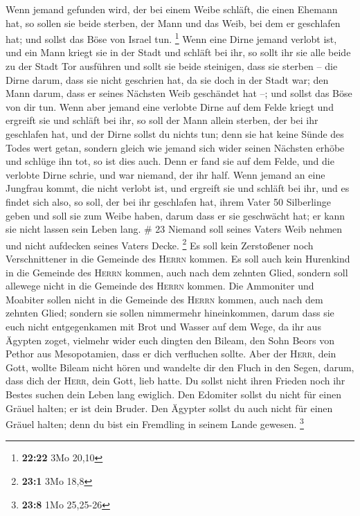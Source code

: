  Wenn jemand gefunden wird, der bei einem Weibe schläft,
die einen Ehemann hat, so sollen sie beide sterben, der Mann und das
Weib, bei dem er geschlafen hat; und sollst das Böse von Israel tun.
\footnote{\textbf{22:22} 3Mo 20,10}  Wenn eine Dirne
jemand verlobt ist, und ein Mann kriegt sie in der Stadt und schläft bei
ihr,  so sollt ihr sie alle beide zu der Stadt Tor
ausführen und sollt sie beide steinigen, dass sie sterben -- die Dirne
darum, dass sie nicht geschrien hat, da sie doch in der Stadt war; den
Mann darum, dass er seines Nächsten Weib geschändet hat --; und sollst
das Böse von dir tun.  Wenn aber jemand eine verlobte
Dirne auf dem Felde kriegt und ergreift sie und schläft bei ihr, so soll
der Mann allein sterben, der bei ihr geschlafen hat,  und
der Dirne sollst du nichts tun; denn sie hat keine Sünde des Todes wert
getan, sondern gleich wie jemand sich wider seinen Nächsten erhöbe und
schlüge ihn tot, so ist dies auch.  Denn er fand sie auf
dem Felde, und die verlobte Dirne schrie, und war niemand, der ihr half.
 Wenn jemand an eine Jungfrau kommt, die nicht verlobt
ist, und ergreift sie und schläft bei ihr, und es findet sich also,
 so soll, der bei ihr geschlafen hat, ihrem Vater 50
Silberlinge geben und soll sie zum Weibe haben, darum dass er sie
geschwächt hat; er kann sie nicht lassen sein Leben lang. \# 23
 Niemand soll seines Vaters Weib nehmen und nicht
aufdecken seines Vaters Decke. \footnote{\textbf{23:1} 3Mo 18,8}
 Es soll kein Zerstoßener noch Verschnittener in die
Gemeinde des \textsc{Herrn} kommen.  Es soll auch kein
Hurenkind in die Gemeinde des \textsc{Herrn} kommen, auch nach dem
zehnten Glied, sondern soll allewege nicht in die Gemeinde des
\textsc{Herrn} kommen.  Die Ammoniter und Moabiter sollen
nicht in die Gemeinde des \textsc{Herrn} kommen, auch nach dem zehnten
Glied; sondern sie sollen nimmermehr hineinkommen,  darum
dass sie euch nicht entgegenkamen mit Brot und Wasser auf dem Wege, da
ihr aus Ägypten zoget, vielmehr wider euch dingten den Bileam, den Sohn
Beors von Pethor aus Mesopotamien, dass er dich verfluchen sollte.
 Aber der \textsc{Herr}, dein Gott, wollte Bileam nicht
hören und wandelte dir den Fluch in den Segen, darum, dass dich der
\textsc{Herr}, dein Gott, lieb hatte.  Du sollst nicht
ihren Frieden noch ihr Bestes suchen dein Leben lang ewiglich.
 Den Edomiter sollst du nicht für einen Gräuel halten; er
ist dein Bruder. Den Ägypter sollst du auch nicht für einen Gräuel
halten; denn du bist ein Fremdling in seinem Lande gewesen. \footnote{\textbf{23:8}
  1Mo 25,25-26}


